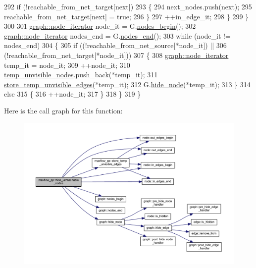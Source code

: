 \begin{DoxyCode}
292         \textcolor{keywordflow}{if} (!reachable\_from\_net\_target[next])
293         \{
294         next\_nodes.push(next);
295         reachable\_from\_net\_target[next] = \textcolor{keyword}{true};
296         \}
297         ++in\_edge\_it;
298     \}
299     \}
300 
301     \mbox{\hyperlink{classgraph_a2cb374b84c133ce13f94e73c3e5da7fa}{graph::node\_iterator}} node\_it = G.\mbox{\hyperlink{classgraph_aec053a4b509d1be804237a80044c54c0}{nodes\_begin}}();
302     \mbox{\hyperlink{classgraph_a2cb374b84c133ce13f94e73c3e5da7fa}{graph::node\_iterator}} nodes\_end = G.\mbox{\hyperlink{classgraph_abbf9c0cb5629e98e1142254911238173}{nodes\_end}}();
303     \textcolor{keywordflow}{while} (node\_it != nodes\_end)
304     \{
305     \textcolor{keywordflow}{if} ((!reachable\_from\_net\_source[*node\_it]) || 
306         (!reachable\_from\_net\_target[*node\_it]))
307     \{
308         \mbox{\hyperlink{classgraph_a2cb374b84c133ce13f94e73c3e5da7fa}{graph::node\_iterator}} temp\_it = node\_it;
309         ++node\_it;
310         \mbox{\hyperlink{classmaxflow__pp_a0510a162f178364f36794e10022cda49}{temp\_unvisible\_nodes}}.push\_back(*temp\_it);
311         \mbox{\hyperlink{classmaxflow__pp_abb23812a3e8bca1955b835d3c41836e1}{store\_temp\_unvisible\_edges}}(*temp\_it);
312         G.\mbox{\hyperlink{classgraph_a214618b5e3c02695779350532506e225}{hide\_node}}(*temp\_it);
313     \}
314     \textcolor{keywordflow}{else}
315     \{
316         ++node\_it;
317     \}
318     \}
319 \}
\end{DoxyCode}
Here is the call graph for this function\+:\nopagebreak
\begin{figure}[H]
\begin{center}
\leavevmode
\includegraphics[width=350pt]{classmaxflow__pp_a93bb037fd3fc83c6558b560fc4da2340_cgraph}
\end{center}
\end{figure}
